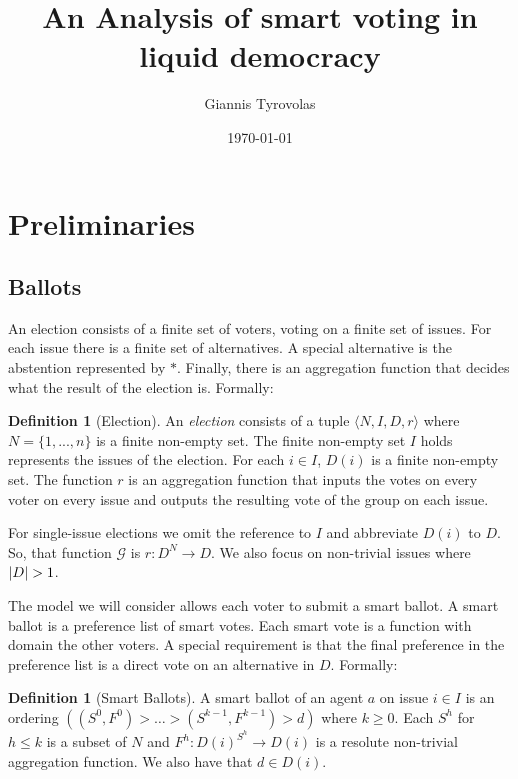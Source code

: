 \documentclass[11pt,a4paper, titlepage]{article}
\title{An Analysis of smart voting in liquid democracy}
\author{Giannis Tyrovolas}
\date{\today}
\DeclarePairedDelimiter\abs{\lvert}{\rvert}
\theoremstyle{definition}
\newtheorem{definition}[theorem]{Definition}
\begin{document}
\maketitle

\tableofcontents

\newpage

\section{Preliminaries}

\subsection{Ballots}


An election consists of a finite set of voters, voting on a finite set of issues. For each issue there is a finite set of alternatives. A special alternative is the abstention represented by $*$. Finally, there is an aggregation function that decides what the result of the election is. Formally:

\begin{definition}[Election]
    An \emph{election} consists of a tuple $\langle N, I, D, r\rangle $ where $N = \{1,..., n\} $ is a finite non-empty set. The finite non-empty set $I$ holds represents the issues of the election. For each $i \in I$, $D(i)$ is a finite non-empty set. The function $r$ is an aggregation function that inputs the votes on every voter on every issue and outputs the resulting vote of the group on each issue.
\end{definition}

For single-issue elections we omit the reference to $I$ and abbreviate $D(i)$ to $D$. So, that function $\mathcal{G}$ is $r \colon D^N \longrightarrow D$. We also focus on non-trivial issues where $\abs{D} > 1$.

The model we will consider allows each voter to submit a smart ballot. A smart ballot is a preference list of smart votes. Each smart vote is a function with domain the other voters. A special requirement is that the final preference in the preference list is a direct vote on an alternative in $D$. Formally:

\begin{definition}[Smart Ballots]
    A smart ballot of an agent $a$ on issue $i \in I$ is an ordering $( (S^0, F^0) > \ldots > (S^{k-1}, F^{k-1}) > d)$ where $k \geq 0$. Each $S^h$ for $h \leq k$ is a subset of $N$ and $F^h \colon D(i)^{S^h} \longrightarrow D(i)$ is a resolute non-trivial aggregation function. We also have that $d \in D(i)$.   
\end{definition}
\end{document}
